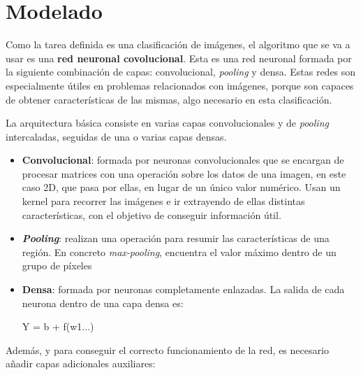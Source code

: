 \documentclass{uc3mpracticas}
\begin{document}
    \newpage

  \section{Modelado}

  Como la tarea definida es una clasificación de imágenes, el algoritmo que se va a usar es una \textbf{red neuronal covolucional}. Esta es una red neuronal formada por la siguiente combinación de capas: convolucional, \textit{pooling} y densa. Estas redes son especialmente útiles en problemas relacionados con imágenes, porque son capaces de obtener características de las mismas, algo necesario en esta clasificación.

  \vspace{3mm}

  La arquitectura básica consiste en varias capas convolucionales y de \textit{pooling} intercaladas, seguidas de una o varias capas densas.

  \begin{itemize}
    \item \textbf{Convolucional}: formada por neuronas convolucionales que se encargan de procesar matrices con una operación sobre los datos de una imagen, en este caso 2D, que pasa por ellas, en lugar de un único valor numérico. Usan un kernel para recorrer las imágenes e ir extrayendo de ellas distintas características, con el objetivo de conseguir información útil.
    \item \textbf{\textit{Pooling}}: realizan una operación para resumir las características de una región. En concreto \textit{max-pooling}, encuentra el valor máximo dentro de un grupo de píxeles
    \item \textbf{Densa}: formada por neuronas completamente enlazadas. La salida de cada neurona dentro de una capa densa es:

    \begin{center}
      Y = b + f(w1...)
    \end{center}
  \end{itemize}

  Además, y para conseguir el correcto funcionamiento de la red, es necesario añadir capas adicionales auxiliares:
\end{document}
